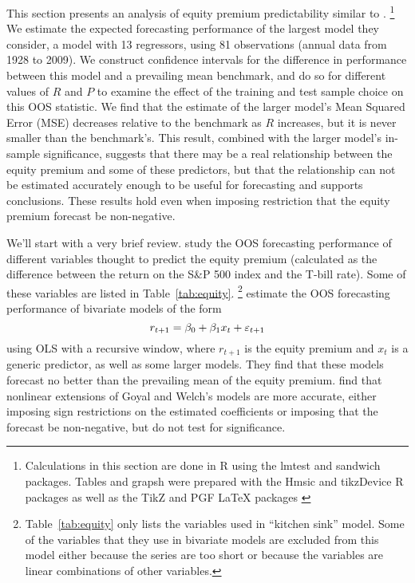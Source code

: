 \documentclass[12pt]{article}
\begin{document}
This section presents an analysis of equity premium predictability
similar to \citet{GoW:08}.%
\footnote{Calculations in this section are done in R \citep{Rde:10}
  using the lmtest \citep{ZeH:02} and sandwich \citep{Zei:04}
  packages. Tables and grapsh were prepared with the Hmsic
  \citep{Har:10} and tikzDevice \citep{ShB:11:0.6.1} R packages as
  well as the TikZ and PGF LaTeX packages \citep{Tan:10}} %
We estimate the expected forecasting
performance of the largest model they consider, a model with 13
regressors, using 81 observations (annual data from 1928 to 2009).  We
construct confidence intervals for the difference in performance
between this model and a prevailing mean benchmark, and do so for
different values of $R$ and $P$ to examine the effect of the training
and test sample choice on this OOS statistic.  We find that the
estimate of the larger model's Mean Squared Error (MSE) decreases relative to the
benchmark as $R$ increases, but it is never smaller than the
benchmark's.  This result, combined with the larger model's in-sample
significance, suggests that there may be a real relationship between
the equity premium and some of these predictors, but that the
relationship can not be estimated accurately enough to be useful for
forecasting and supports  conclusions.  These results
hold even when imposing  restriction that the equity
premium forecast be non-negative.

We'll start with a very brief review.  \citet{GoW:08}
study the OOS forecasting performance of different variables thought
to predict the equity premium (calculated as the difference between
the return on the S\&P 500 index and the T-bill rate).  Some of these
variables are listed in
Table~\ref{tab:equity}.%
\footnote{Table~\ref{tab:equity} only lists the
  variables used in  ``kitchen sink''
  model.  Some of the variables that they use in bivariate models are
  excluded from this model either because the series are too short or
  because the variables are linear combinations of other variables.} %
\citet{GoW:08} estimate the OOS forecasting
performance of bivariate models of the form
\[
r_{t+1} = \beta_0 + \beta_1 x_t + \varepsilon_{t+1}
\]
using OLS with a recursive window, where $r_{t+1}$ is the equity
premium and $x_t$ is a generic predictor, as well as some larger
models.  They find that these models forecast no better than the
prevailing mean of the equity premium.
\citet{CaT:08} find that nonlinear extensions of
Goyal and Welch's models are more accurate, either imposing sign
restrictions on the estimated coefficients or imposing that the
forecast be non-negative, but do not test for significance.
\end{document}
